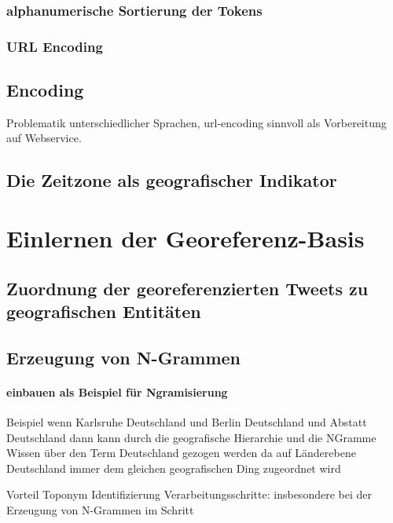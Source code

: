 
		  	\subsubsection{alphanumerische Sortierung der Tokens}

		  	\subsubsection{URL Encoding}
		  		\subsection{Encoding}
				Problematik unterschiedlicher Sprachen, 
				url-encoding sinnvoll als Vorbereitung auf Webservice. 

		  	

		\subsection{Die Zeitzone als geografischer Indikator}     

	\section{Einlernen der Georeferenz-Basis}

		\subsection{Zuordnung der georeferenzierten Tweets zu geografischen Entitäten} 

		\subsection{Erzeugung von N-Grammen}

				\paragraph{einbauen als Beispiel für Ngramisierung} 
				Beispiel wenn Karlsruhe Deutschland und Berlin Deutschland und Abstatt Deutschland dann kann durch die geografische Hierarchie und die NGramme Wissen über den Term Deutschland gezogen werden da auf Länderebene Deutschland immer dem gleichen geografischen Ding zugeordnet wird 

				Vorteil Toponym Identifizierung Verarbeitungsschritte:  insbesondere bei der Erzeugung von N-Grammen im Schritt 


